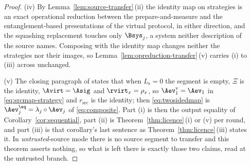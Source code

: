\begin{proof}
(iv) By Lemma~\ref{lem:source-transfer}\,(ii) the identity map on strategies is
an exact operational reduction between the prepare-and-measure and the
entanglement-based presentations of the virtual protocol, in either direction,
and the squashing replacement touches only $\Bsys_j$, a system neither
description of the source names. Composing with the identity map changes
neither the strategies nor their images, so
Lemma~\ref{lem:opreduction-transfer}\,(v) carries (i) to (iii) across
unchanged.

(v) The closing paragraph of  states
that when $L_{\mathrm s}=0$ the segment is empty, $\Xi$ is the identity,
$\Avirt=\Asig$ and $\rvirt_x=\rho_x$, so
$\Aev^{\mathrm{v}}_1=\Aev_1$ in \eqref{eq:srcmap-strategy} and
$r_{\mathrm{src}}$ is the identity; then \eqref{eq:twosidedmap} is
$\Aev^{\sq}_j=\lambda_j\circ\Aev_j$ of \eqref{eq:composite}. Part (i) is then
the output equality of Corollary~\ref{cor:sequential}, part (ii) is
Theorem~\ref{thm:licence}\,(i) or (v) per round, and part (iii) is that
corollary's last sentence as Theorem~\ref{thm:licence}\,(iii) states it. In
\emph{untrusted}-source mode there is no source segment to transfer and this
theorem asserts nothing, so what is left there is exactly those two claims,
read at the untrusted branch.
\end{proof}
